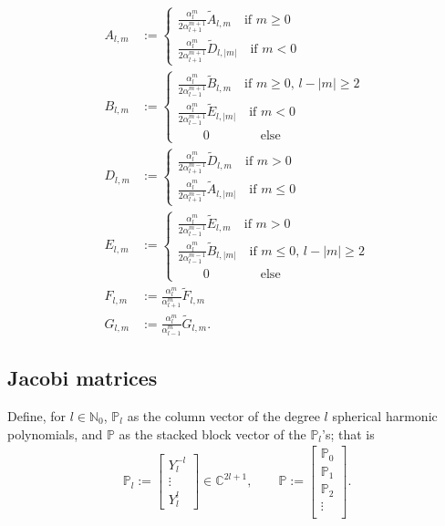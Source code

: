 \documentclass[11pt, oneside]{article}   	%
\newcommand{\C}{\mathbb{C}}
\newcommand{\No}{\mathbb{N}_0}
\newcommand{\alphalm}{\alpha^m_l}
\newcommand{\Atilde}{\tilde{A}_{l,m}}
\newcommand{\Btilde}{\tilde{B}_{l,m}}
\newcommand{\Dtilde}{\tilde{D}_{l,m}}
\newcommand{\Etilde}{\tilde{E}_{l,m}}
\newcommand{\Ftilde}{\tilde{F}_{l,m}}
\newcommand{\Gtilde}{\tilde{G}_{l,m}}
\newcommand{\Alm}{A_{l,m}}
\newcommand{\Blm}{B_{l,m}}
\newcommand{\Dlm}{D_{l,m}}
\newcommand{\Elm}{E_{l,m}}
\newcommand{\Flm}{F_{l,m}}
\newcommand{\Glm}{G_{l,m}}
\newcommand{\bigP}{\mathbb{P}}
\newcommand{\Pl}{\mathbb{P}_l}
\begin{document}
\begin{align}
\Alm &:= \begin{cases}
			\frac{\alphalm}{2\alpha^{m+1}_{l+1}} \Atilde \quad \text{if } m\ge0 \\
			\frac{\alphalm}{2\alpha^{m+1}_{l+1}} \tilde{D}_{l,|m|} \quad \text{if } m<0 
	       \end{cases} \\
\Blm &:= \begin{cases}
			\frac{\alphalm}{2\alpha^{m+1}_{l-1}} \Btilde \quad \text{if } m\ge0, \, l - |m| \ge 2 \\
			\frac{\alphalm}{2\alpha^{m+1}_{l-1}} \tilde{E}_{l,|m|} \quad \text{if } m<0 \\
			\quad \quad 0 \quad \quad \quad \quad \text{else} 
	        \end{cases} \\
\Dlm &:= \begin{cases}
			\frac{\alphalm}{2\alpha^{m-1}_{l+1}} \Dtilde \quad \text{if } m>0 \\
			\frac{\alphalm}{2\alpha^{m-1}_{l+1}} \tilde{A}_{l,|m|} \quad \text{if } m\le0 
	       \end{cases} \\
\Elm &:= \begin{cases}
			\frac{\alphalm}{2\alpha^{m-1}_{l-1}} \Etilde \quad \text{if } m>0 \\
			\frac{\alphalm}{2\alpha^{m-1}_{l-1}} \tilde{B}_{l,|m|} \quad \text{if } m\le0 , \, l - |m| \ge 2 \\
			\quad \quad 0 \quad \quad \quad \quad \text{else} 
	        \end{cases} \\ 
\Flm &:= \frac{\alphalm}{\alpha^{m}_{l+1}} \Ftilde \\
\Glm &:= \frac{\alphalm}{\alpha^{m}_{l-1}} \Gtilde.
\end{align}



\subsection{Jacobi matrices}

Define, for \(l \in \No\), \(\Pl\) as the column vector of the degree \(l\) spherical harmonic polynomials, and \(\bigP\) as the stacked block vector of the \(\Pl\)'s; that is
\begin{align}
\Pl := \begin{bmatrix}
		Y^{-l}_l \\
		\vdots \\
		Y^l_l
	\end{bmatrix} \in \C^{2l+1}, 
\quad \quad 
\bigP := \begin{bmatrix}
		\bigP_0 \\
		\hline
		\bigP_1 \\
		\hline
		\bigP_2 \\
		\vdots \\
	\end{bmatrix}.
\end{align}
\end{document}

